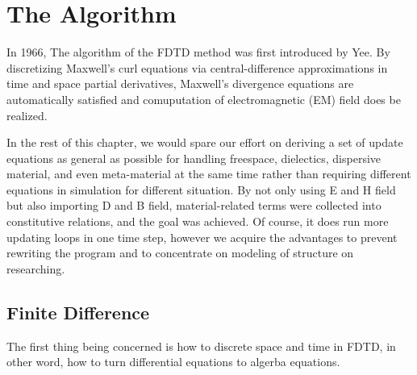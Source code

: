\section{The Algorithm}

In 1966, The algorithm of the FDTD method was first introduced by Yee. By discretizing Maxwell's curl equations via
central-difference approximations in time and space partial derivatives, Maxwell's divergence equations are
automatically satisfied and comuputation of electromagnetic (EM) field does be realized.


In the rest of this chapter, we would spare our effort on deriving a set of update equations as general as possible for
handling freespace, dielectics, dispersive material, and even meta-material at the same time rather than requiring
different equations in simulation for different situation. By not only using E and H field but also importing D and B
field, material-related terms were collected into constitutive relations, and the goal was achieved. Of course, it does
run more updating loops in one time step, however we acquire the advantages to prevent rewriting the program and to
concentrate on modeling of structure on researching.

\subsection{Finite Difference}
The first thing being concerned is how to discrete space and time in FDTD, in other word, how to turn differential
equations to algerba equations.
